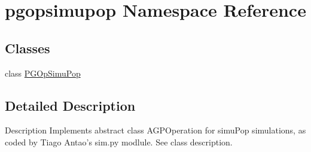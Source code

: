 \hypertarget{namespacepgopsimupop}{}\section{pgopsimupop Namespace Reference}
\label{namespacepgopsimupop}
\subsection*{Classes}
\begin{DoxyCompactItemize}
\item 
class \hyperlink{classpgopsimupop_1_1PGOpSimuPop}{P\+G\+Op\+Simu\+Pop}
\end{DoxyCompactItemize}


\subsection{Detailed Description}
\begin{DoxyVerb}Description
Implements abstract class AGPOperation for simuPop simulations,
as coded by Tiago Antao's sim.py modlule.  See class description.
\end{DoxyVerb}
 
